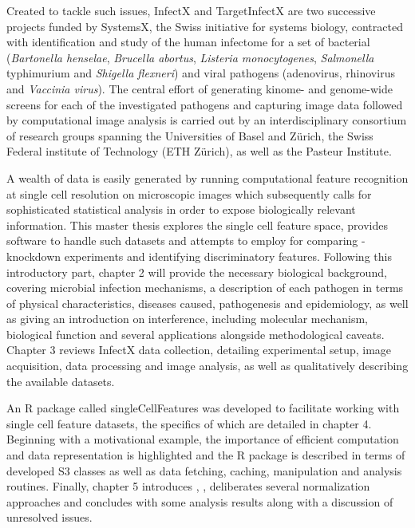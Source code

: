 Created to tackle such issues, InfectX and TargetInfectX are two successive  projects funded by SystemsX, the Swiss initiative for systems biology, contracted with identification and study of the human infectome for a set of bacterial (\textit{Bartonella henselae}, \textit{Brucella abortus}, \textit{Listeria monocytogenes}, \textit{Salmonella} typhimurium and \textit{Shigella flexneri}) and viral pathogens (adenovirus, rhinovirus and \textit{Vaccinia virus}). The central effort of generating kinome- and genome-wide  screens for each of the investigated pathogens and capturing image data followed by computational image analysis is carried out by an interdisciplinary consortium of research groups spanning the Universities of Basel and Z\"urich, the Swiss Federal institute of Technology (ETH Z\"urich), as well as the Pasteur Institute.

A wealth of data is easily generated by running computational feature recognition at single cell resolution on microscopic images which subsequently calls for sophisticated statistical analysis in order to expose biologically relevant information. This master thesis explores the single cell feature space, provides software to handle such datasets and attempts to employ  for comparing -knockdown experiments and identifying discriminatory features. Following this introductory part, chapter 2 will provide the necessary biological background, covering microbial infection mechanisms, a description of each pathogen in terms of physical characteristics, diseases caused, pathogenesis and epidemiology, as well as giving an introduction on  interference, including molecular mechanism, biological function and several applications alongside methodological caveats. Chapter 3 reviews InfectX data collection, detailing experimental setup, image acquisition, data processing and image analysis, as well as qualitatively describing the available datasets.

An R package called singleCellFeatures was developed to facilitate working with single cell feature datasets, the specifics of which are detailed in chapter 4. Beginning with a motivational example, the importance of efficient computation and data representation is highlighted and the R package is described in terms of developed S3 classes as well as data fetching, caching, manipulation and analysis routines. Finally, chapter 5 introduces , , deliberates several normalization approaches and concludes with some analysis results along with a discussion of unresolved issues.

